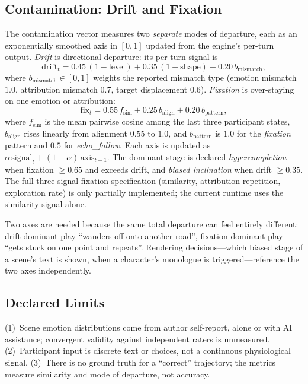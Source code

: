 \documentclass[runningheads]{llncs}
\begin{document}
\subsection{Contamination: Drift and Fixation}
\label{sec:contamination}

The contamination vector measures two \emph{separate} modes of departure, each as an exponentially smoothed axis in $[0,1]$ updated from the engine's per-turn output. \emph{Drift} is directional departure: its per-turn signal is
\begin{equation}
\text{drift}_t = 0.45\,(1-\text{level}) + 0.35\,(1-\text{shape}) + 0.20\,b_{\text{mismatch}},
\end{equation}
where $b_{\text{mismatch}} \in [0,1]$ weights the reported mismatch type (emotion mismatch $1.0$, attribution mismatch $0.7$, target displacement $0.6$). \emph{Fixation} is over-staying on one emotion or attribution:
\begin{equation}
\text{fix}_t = 0.55\,f_{\text{sim}} + 0.25\,b_{\text{align}} + 0.20\,b_{\text{pattern}},
\end{equation}
where $f_{\text{sim}}$ is the mean pairwise cosine among the last three participant states, $b_{\text{align}}$ rises linearly from alignment $0.55$ to $1.0$, and $b_{\text{pattern}}$ is $1.0$ for the \emph{fixation} pattern and $0.5$ for \emph{echo\_follow}. Each axis is updated as $\alpha\,\text{signal}_t + (1-\alpha)\,\text{axis}_{t-1}$. The dominant stage is declared \emph{hypercompletion} when fixation $\ge 0.65$ and exceeds drift, and \emph{biased inclination} when drift $\ge 0.35$. The full three-signal fixation specification (similarity, attribution repetition, exploration rate) is only partially implemented; the current runtime uses the similarity signal alone.

Two axes are needed because the same total departure can feel entirely different: drift-dominant play ``wanders off onto another road'', fixation-dominant play ``gets stuck on one point and repeats''. Rendering decisions---which biased stage of a scene's text is shown, when a character's monologue is triggered---reference the two axes independently.

\subsection{Declared Limits}
(1)~Scene emotion distributions come from author self-report, alone or with AI assistance; convergent validity against independent raters is unmeasured. (2)~Participant input is discrete text or choices, not a continuous physiological signal. (3)~There is no ground truth for a ``correct'' trajectory; the metrics measure similarity and mode of departure, not accuracy.
\end{document}
